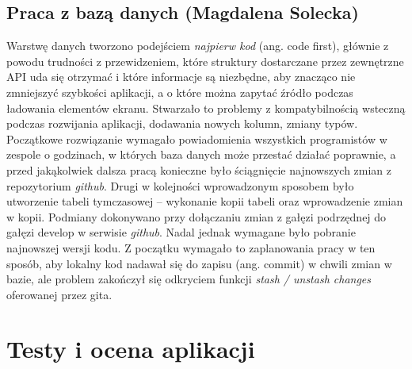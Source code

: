\documentclass[10pt,twoside,a4paper]{report}
\begin{document}
\section{Praca z bazą danych (Magdalena Solecka)}
\par Warstwę danych tworzono podejściem \textit{najpierw kod} (ang. code first), głównie z powodu trudności z przewidzeniem, które struktury dostarczane przez zewnętrzne API uda się otrzymać i które informacje są niezbędne, aby znacząco nie zmniejszyć szybkości aplikacji, a o które można zapytać źródło podczas ładowania elementów ekranu. Stwarzało to problemy z kompatybilnością wsteczną podczas rozwijania aplikacji, dodawania nowych kolumn, zmiany typów. Początkowe rozwiązanie wymagało powiadomienia wszystkich programistów w zespole o godzinach, w których baza danych może przestać działać poprawnie, a przed jakąkolwiek dalsza pracą konieczne było ściągnięcie najnowszych zmian z repozytorium \textit{github}. Drugi w kolejności wprowadzonym sposobem było utworzenie tabeli tymczasowej -- wykonanie kopii tabeli oraz wprowadzenie zmian w kopii. Podmiany dokonywano przy dołączaniu zmian z gałęzi podrzędnej do gałęzi develop w serwisie \textit{github}. Nadal jednak wymagane było pobranie najnowszej wersji kodu. Z początku wymagało to zaplanowania pracy w ten sposób, aby lokalny kod nadawał się do zapisu (ang. commit) w chwili zmian w bazie, ale problem zakończył się odkryciem funkcji \textit{stash / unstash changes} oferowanej przez gita.

\chapter{Testy i ocena aplikacji}
\end{document}
